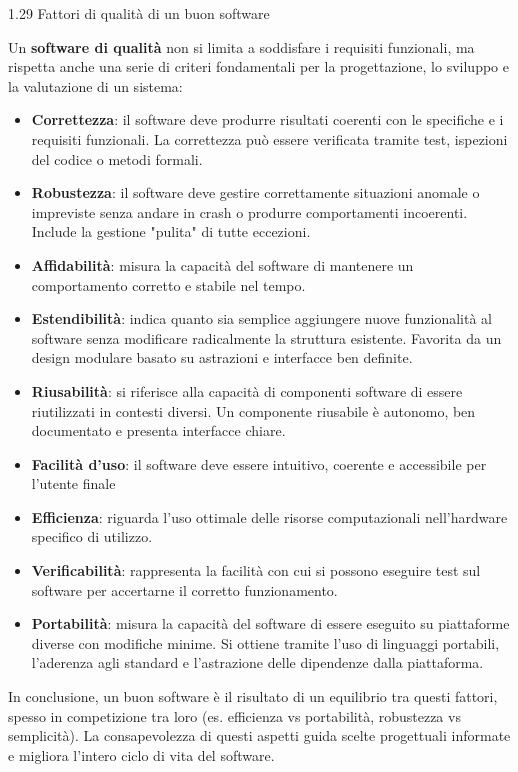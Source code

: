 \begin{problem}{1.29}
Fattori di qualità di un buon software
\end{problem}
\begin{solution}
Un \textbf{software di qualità} non si limita a soddisfare i requisiti funzionali, ma rispetta anche una 
serie di criteri fondamentali per la progettazione, lo sviluppo e la valutazione di un sistema:

\begin{itemize}
	\item \textbf{Correttezza}: il software deve produrre risultati coerenti con le specifiche e i requisiti funzionali. 
	La correttezza può essere verificata tramite test, ispezioni del codice o metodi formali.
	\item \textbf{Robustezza}: il software deve gestire correttamente situazioni anomale o impreviste senza andare in crash 
	o produrre comportamenti incoerenti. Include la gestione "pulita" di tutte eccezioni.
	\item \textbf{Affidabilità}: misura la capacità del software di mantenere un comportamento corretto e stabile nel tempo.
	\item \textbf{Estendibilità}: indica quanto sia semplice aggiungere nuove funzionalità al software senza modificare
	radicalmente la struttura esistente. Favorita da un design modulare basato su astrazioni e interfacce ben definite.
	\item \textbf{Riusabilità}: si riferisce alla capacità di componenti software di essere riutilizzati in contesti diversi.
	Un componente riusabile è autonomo, ben documentato e presenta interfacce chiare.
	\item \textbf{Facilità d'uso}: il software deve essere intuitivo, coerente e accessibile per l'utente finale
	\item \textbf{Efficienza}: riguarda l'uso ottimale delle risorse computazionali nell'hardware specifico di utilizzo.
	\item \textbf{Verificabilità}: rappresenta la facilità con cui si possono eseguire test sul software per accertarne 
	il corretto funzionamento.
	\item \textbf{Portabilità}: misura la capacità del software di essere eseguito su piattaforme diverse con modifiche minime. 
	Si ottiene tramite l'uso di linguaggi portabili, l'aderenza agli standard e l'astrazione delle dipendenze dalla piattaforma.
\end{itemize}
\medskip
In conclusione, un buon software è il risultato di un equilibrio tra questi fattori, spesso in competizione tra loro (es. efficienza vs portabilità, robustezza vs semplicità). 
La consapevolezza di questi aspetti guida scelte progettuali informate e migliora l'intero ciclo di vita del software.
\end{solution}

